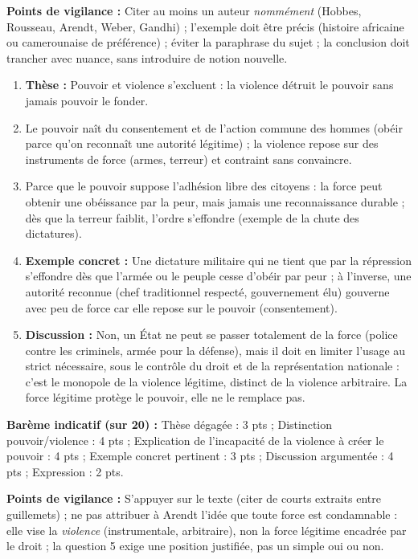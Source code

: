 \documentclass[11pt]{article}
\newcommand{\cle}[1]{{\popxbold\color{popdark}#1}}
\begin{document}
\begin{corrige}
\textbf{Points de vigilance :} Citer au moins un auteur \emph{nommément} (Hobbes, Rousseau, Arendt, Weber, Gandhi) ; l'exemple doit être précis (histoire africaine ou camerounaise de préférence) ; éviter la paraphrase du sujet ; la conclusion doit trancher avec nuance, sans introduire de notion nouvelle.
\end{corrige}

\begin{corrige}
\begin{enumerate}
\item \textbf{Thèse :} Pouvoir et violence s'excluent : la violence détruit le pouvoir sans jamais pouvoir le fonder.
\item Le \cle{pouvoir} naît du consentement et de l'action commune des hommes (obéir parce qu'on reconnaît une autorité légitime) ; la \cle{violence} repose sur des instruments de force (armes, terreur) et contraint sans convaincre.
\item Parce que le pouvoir suppose l'adhésion libre des citoyens : la force peut obtenir une obéissance par la peur, mais jamais une reconnaissance durable ; dès que la terreur faiblit, l'ordre s'effondre (exemple de la chute des dictatures).
\item \textbf{Exemple concret :} Une dictature militaire qui ne tient que par la répression s'effondre dès que l'armée ou le peuple cesse d'obéir par peur ; à l'inverse, une autorité reconnue (chef traditionnel respecté, gouvernement élu) gouverne avec peu de force car elle repose sur le pouvoir (consentement).
\item \textbf{Discussion :} Non, un État ne peut se passer totalement de la force (police contre les criminels, armée pour la défense), mais il doit en limiter l'usage au strict nécessaire, sous le contrôle du droit et de la représentation nationale : c'est le \cle{monopole de la violence légitime}, distinct de la violence arbitraire. La force légitime protège le pouvoir, elle ne le remplace pas.
\end{enumerate}
\textbf{Barème indicatif (sur 20) :} Thèse dégagée : 3 pts ; Distinction pouvoir/violence : 4 pts ; Explication de l'incapacité de la violence à créer le pouvoir : 4 pts ; Exemple concret pertinent : 3 pts ; Discussion argumentée : 4 pts ; Expression : 2 pts.

\textbf{Points de vigilance :} S'appuyer sur le texte (citer de courts extraits entre guillemets) ; ne pas attribuer à Arendt l'idée que toute force est condamnable : elle vise la \emph{violence} (instrumentale, arbitraire), non la force légitime encadrée par le droit ; la question 5 exige une position justifiée, pas un simple oui ou non.
\end{corrige}
\end{document}
